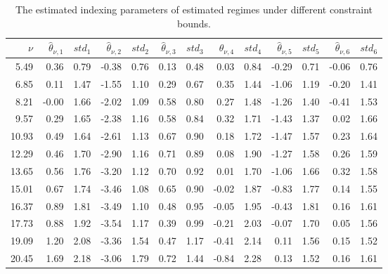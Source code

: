 \documentclass{article}
\begin{document}
\begin{table}[!htbp]
\caption{The estimated indexing parameters of estimated regimes under different constraint bounds.}
	\centering
\begin{tabular}{rrrrrrrrrrrrr}\hline 
	$\nu$ & $\widehat{\theta}_{\nu,1}$ & $std_1$ & $\widehat{\theta}_{\nu,2}$ & $std_2$ & $\widehat{\theta}_{\nu,3}$ & $std_3$ & $\widehat{\theta}_{\nu,4}$ & $std_4$ &  $\widehat{\theta}_{\nu,5}$ & $std_5$ & $\widehat{\theta}_{\nu,6}$ & $std_6$ \\ \hline 
	5.49 &     0.36 &     0.79 &    -0.38 &     0.76  &     0.13 &     0.48 &     0.03 &     0.84 &    -0.29 &     0.71  &    -0.06 &     0.76 \\ 
	6.85 &     0.11 &     1.47 &    -1.55 &     1.10  &     0.29 &     0.67 &     0.35 &     1.44 &    -1.06 &     1.19  &    -0.20 &     1.41 \\ 
	8.21 &    -0.00 &     1.66 &    -2.02 &     1.09  &     0.58 &     0.80 &     0.27 &     1.48 &    -1.26 &     1.40  &    -0.41 &     1.53 \\ 
	9.57 &     0.29 &     1.65 &    -2.38 &     1.16  &     0.58 &     0.84 &     0.32 &     1.71 &    -1.43 &     1.37  &     0.02 &     1.66 \\ 
	10.93 &     0.49 &     1.64 &    -2.61 &     1.13  &     0.67 &     0.90 &     0.18 &     1.72 &    -1.47 &     1.57  &     0.23 &     1.64 \\ 
	12.29 &     0.46 &     1.70 &    -2.90 &     1.16  &     0.71 &     0.89 &     0.08 &     1.90 &    -1.27 &     1.58  &     0.26 &     1.59 \\ 
	13.65 &     0.56 &     1.76 &    -3.20 &     1.12  &     0.70 &     0.92 &     0.01 &     1.70 &    -1.06 &     1.66  &     0.32 &     1.58 \\ 
	15.01 &     0.67 &     1.74 &    -3.46 &     1.08  &     0.65 &     0.90 &    -0.02 &     1.87 &    -0.83 &     1.77  &     0.14 &     1.55 \\ 
	16.37 &     0.89 &     1.81 &    -3.49 &     1.10  &     0.48 &     0.95 &    -0.05 &     1.95 &    -0.43 &     1.81  &     0.16 &     1.61 \\ 
	17.73 &     0.88 &     1.92 &    -3.54 &     1.17  &     0.39 &     0.99 &    -0.21 &     2.03 &    -0.07 &     1.70  &     0.05 &     1.56 \\ 
	19.09 &     1.20 &     2.08 &    -3.36 &     1.54  &     0.47 &     1.17 &    -0.41 &     2.14 &     0.11 &     1.56  &     0.15 &     1.52 \\ 
	20.45 &     1.69 &     2.18 &    -3.06 &     1.79  &     0.72 &     1.44 &    -0.84 &     2.28 &     0.13 &     1.52  &     0.16 &     1.61 \\ 

\end{tabular}
\end{table}
\end{document}
